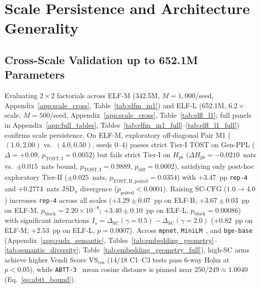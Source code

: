 \documentclass[11pt,a4paper]{article}
\begin{document}
\begin{table}[t]
    \centering
    \caption{Mechanistic evaluation of Attractor-Contrast-Escape (ACE)~\citep{zhang2026selfcond} self-conditioning feedback projection on ELF-B (seeds $201\text{--}205$, $n=5$ seeds/condition), including uncompensated steering (Rows 3--6, unpaired Welch 95\% sensitivity CIs) and $\gamma$-compensated matched ACE at $\gamma^*=1.1699, M=1{,}000$/seed (Row 7, Notebooks 21--22). Full suite in Appendix~\ref{app:full_tables}, Table~\ref{tab:ace_intervention_full}.}
    \label{tab:ace_intervention}
    \resizebox{\textwidth}{!}{}
\end{table}

\section{Scale Persistence and Architecture Generality}
\label{sec:scale}

\subsection{Cross-Scale Validation up to 652.1M Parameters}
Evaluating $2\times 2$ factorials across ELF-M (342.5M, $M=1{,}000$/seed, Appendix~\ref{app:scale_cross}, Table~\ref{tab:elfm_m1}) and ELF-L (652.1M, $6.2\times$ scale, $M=500$/seed, Appendix~\ref{app:scale_cross}, Table~\ref{tab:elfl_l1}; full panels in Appendix~\ref{app:full_tables}, Tables~\ref{tab:elfm_m1_full}--\ref{tab:elfl_l1_full}) confirms scale persistence. On ELF-M, exploratory off-diagonal Pair M1 ($(1.0, 2.00)$ vs.\ $(4.0, 0.50)$, seeds $0\text{--}4$) passes strict Tier-I TOST on Gen-PPL ($\Delta = +0.09$, $p_{\mathrm{TOST,I}} = 0.0052$) but fails strict Tier-I on $H_{\mathrm{ps}}$ ($\Delta H_{\mathrm{ps}} = -0.0210$~nats vs.\ $\pm 0.015$~nats bound, $p_{\mathrm{TOST,I}} = 0.9889$, $p_{\mathrm{diff}} = 0.0002$), satisfying only post-hoc exploratory Tier-II ($\pm 0.025$~nats, $p_{\mathrm{TOST,II,paired}} = 0.0354$) with $+3.47$~pp \texttt{rep-4} and $+0.2774$~nats $\mathrm{JSD}_\pi$ divergence ($p_{\mathrm{paired}} < 0.0001$). Raising $\text{SC-CFG}$ ($1.0 \to 4.0$) increases \texttt{rep-4} across all scales ($+3.29\pm 0.07$~pp on ELF-B; $+3.67\pm 0.03$~pp on ELF-M, $p_{\mathrm{block}} = 2.20\times 10^{-8}$; $+3.40\pm 0.10$~pp on ELF-L, $p_{\mathrm{block}} = 0.00086$) with significant interactions $I_s = \Delta_{\mathrm{SC}}(\gamma=0.5) - \Delta_{\mathrm{SC}}(\gamma=2.0)$ ($+0.82$~pp on ELF-M; $+2.53$~pp on ELF-L, $p=0.0007$). Across \texttt{mpnet}, \texttt{MiniLM}~\citep{reimers2019sentence}, and \texttt{bge-base}~\citep{xiao2024cpack} (Appendix~\ref{app:cuda_semantic}, Tables~\ref{tab:embedding_geometry}--\ref{tab:semantic_diversity}; Table~\ref{tab:embedding_geometry_full}), high-SC arms achieve higher Vendi Score $\mathrm{VS}_{\cos}$ ($14/18$ C1--C3 tests pass 6-way Holm at $p < 0.05$), while \texttt{ABTT-3}~\citep{mu2018all} mean cosine distance is pinned near $250/249 \approx 1.0040$ (Eq.~\eqref{eq:abtt_bound}).
\end{document}
